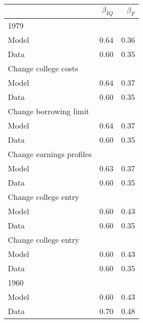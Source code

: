 \begin{tabular}{lrr}
\hline
  & $\beta_{IQ}$  & $\beta_{F}$  \\ 
\hline
1979 &   &   \\ 
Model & 0.64  & 0.36  \\ 
Data & 0.60  & 0.35  \\ 
Change college costs &   &   \\ 
Model & 0.64  & 0.37  \\ 
Data & 0.60  & 0.35  \\ 
Change borrowing limit &   &   \\ 
Model & 0.64  & 0.37  \\ 
Data & 0.60  & 0.35  \\ 
Change earnings profiles &   &   \\ 
Model & 0.63  & 0.37  \\ 
Data & 0.60  & 0.35  \\ 
Change college entry &   &   \\ 
Model & 0.60  & 0.43  \\ 
Data & 0.60  & 0.35  \\ 
Change college entry &   &   \\ 
Model & 0.60  & 0.43  \\ 
Data & 0.60  & 0.35  \\ 
1960 &   &   \\ 
Model & 0.60  & 0.43  \\ 
Data & 0.70  & 0.48  \\ 
\hline
\end{tabular}%
